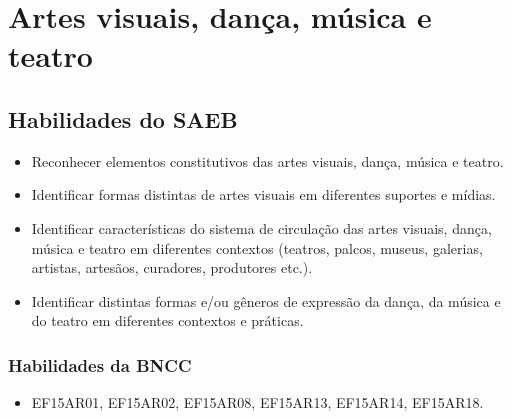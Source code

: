 \chapter[Artes visuais, dança, música e teatro]{\LARGE Artes visuais, dança, música e teatro}

\vspace*{-1cm}
\enlargethispage{2\baselineskip}

\section*{Habilidades do SAEB}

\begin{itemize}
\item Reconhecer elementos constitutivos das artes visuais, dança, música e
teatro.

\item Identificar formas distintas de artes visuais em diferentes suportes e
mídias.

\item Identificar características do sistema de circulação das artes
visuais, dança, música e teatro em diferentes contextos (teatros,
palcos, museus, galerias, artistas, artesãos, curadores, produtores
etc.).

\item Identificar distintas formas e/ou gêneros de expressão da dança, da
música e do teatro em diferentes contextos e práticas.
\end{itemize}

\subsection{Habilidades da BNCC}

\begin{itemize}
\item EF15AR01, EF15AR02, EF15AR08, EF15AR13, EF15AR14, EF15AR18.
\end{itemize}


